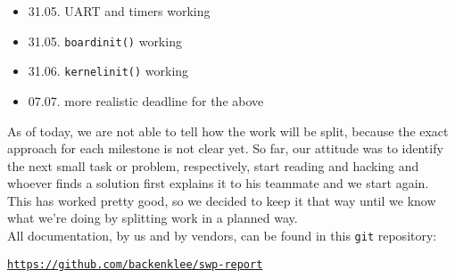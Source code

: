 \documentclass[conference,a4paper]{IEEEtran}
\begin{document}
\begin{itemize}
 \item 31.05. UART and timers working
 \item 31.05. \texttt{board\underbar{ }init()} working
 \item 31.06. \texttt{kernel\underbar{ }init()} working
 \item 07.07. more realistic deadline for the above
\end{itemize}

As of today, we are not able to tell how the work will be split, because the 
exact approach for each milestone is not clear yet. So far, our attitude was to 
identify the next small task or problem, respectively, start reading and 
hacking and whoever finds a solution first explains it to his teammate and we 
start again. This has worked pretty good, so we decided to keep it that way 
until we know what we're doing by splitting work in a planned way.\\

All documentation, by us and by vendors, can be found in this \texttt{git} 
repository:

\texttt{\url{https://github.com/backenklee/swp-report}}





% 
% 
\end{document}
